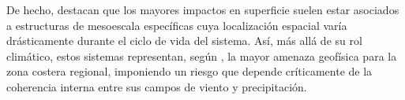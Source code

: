 %
De hecho, \citet{eisenstein2023identification} destacan que los mayores impactos en superficie suelen estar asociados a estructuras de mesoescala específicas cuya localización espacial varía drásticamente durante el ciclo de vida del sistema.
%
Así, más allá de su rol climático, estos sistemas representan, según \citet{gramcianinov2023impact}, la mayor amenaza geofísica para la zona costera regional, imponiendo un riesgo que depende críticamente de la coherencia interna entre sus campos de viento y precipitación.




